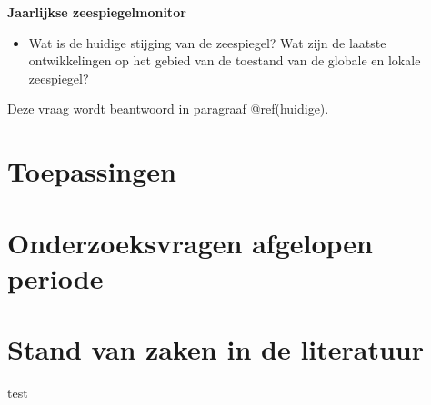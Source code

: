 \documentclass[ddraft]{deltares_report}
\begin{document}
\textbf{Jaarlijkse zeespiegelmonitor}

\begin{itemize}
\tightlist
\item
  Wat is de huidige stijging van de zeespiegel? Wat zijn de laatste
  ontwikkelingen op het gebied van de toestand van de globale en lokale
  zeespiegel?
\end{itemize}

Deze vraag wordt beantwoord in paragraaf @ref(huidige).

\section{Toepassingen}\label{toepassingen}

\section{Onderzoeksvragen afgelopen
periode}\label{onderzoeksvragen-afgelopen-periode}

\section{Stand van zaken in de
literatuur}\label{stand-van-zaken-in-de-literatuur}

test
\end{document}
